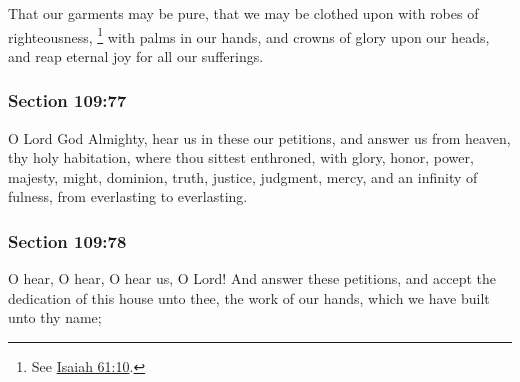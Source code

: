 		That our garments may be pure, that we may be clothed upon with robes of righteousness,%
			\footnote{%
				See \hyperref[ISAIAH-61-10]{Isaiah 61:10}.
				}
		with palms in our hands, and crowns of glory upon our heads, and reap eternal joy for all our sufferings.


	\subsubsection{Section 109:77} %
		\label{DC109-77}

		O Lord God Almighty, hear us in these our petitions, and answer us from heaven, thy holy habitation, where thou sittest enthroned, with glory, honor, power, majesty, might, dominion, truth, justice, judgment, mercy, and an infinity of fulness, from everlasting to everlasting.


	\subsubsection{Section 109:78} %
		\label{DC109-78}

		O hear, O hear, O hear us, O Lord!  And answer these petitions, and accept the dedication of this house unto thee, the work of our hands, which we have built unto thy name;


